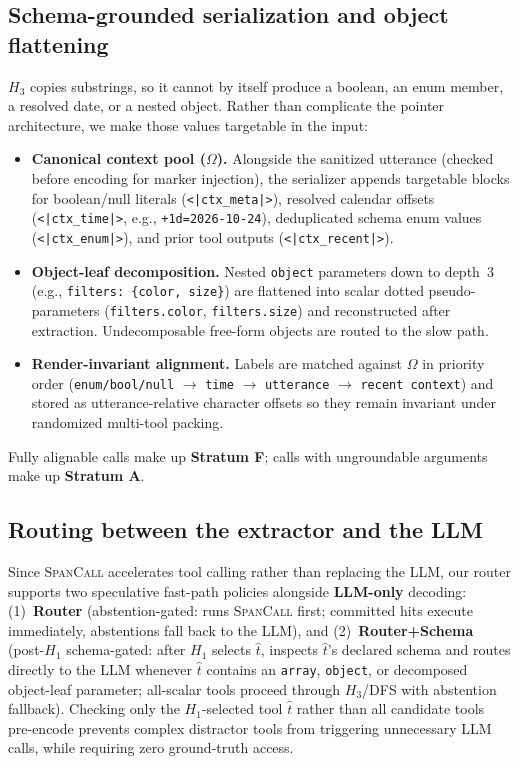 \subsection{Schema-grounded serialization and object flattening}
\label{sec:method:input}

$H_3$ copies substrings, so it cannot by itself produce a boolean, an enum member, a resolved date, or a nested object. Rather than complicate the pointer architecture, we make those values targetable in the input:
\begin{itemize}
    \item \textbf{Canonical context pool ($\Omega$).} Alongside the sanitized utterance (checked before encoding for marker injection), the serializer appends targetable blocks for boolean/null literals (\texttt{<|ctx\_meta|>}), resolved calendar offsets (\texttt{<|ctx\_time|>}, e.g., \texttt{+1d=2026-10-24}), deduplicated schema enum values (\texttt{<|ctx\_enum|>}), and prior tool outputs (\texttt{<|ctx\_recent|>}).
    \item \textbf{Object-leaf decomposition.} Nested \texttt{object} parameters down to depth~3 (e.g., \texttt{filters: \{color, size\}}) are flattened into scalar dotted pseudo-parameters (\texttt{filters.color}, \texttt{filters.size}) and reconstructed after extraction. Undecomposable free-form objects are routed to the slow path.
    \item \textbf{Render-invariant alignment.} Labels are matched against $\Omega$ in priority order (\texttt{enum/bool/null} $\rightarrow$ \texttt{time} $\rightarrow$ \texttt{utterance} $\rightarrow$ \texttt{recent context}) and stored as utterance-relative character offsets so they remain invariant under randomized multi-tool packing.
\end{itemize}
Fully alignable calls make up \textbf{Stratum F}; calls with ungroundable arguments make up \textbf{Stratum A}.

\subsection{Routing between the extractor and the LLM}
\label{sec:method:router}

Since \textsc{SpanCall} accelerates tool calling rather than replacing the LLM, our router supports two speculative fast-path policies alongside \textbf{LLM-only} decoding: (1)~\textbf{Router} (abstention-gated: runs \textsc{SpanCall} first; committed hits execute immediately, abstentions fall back to the LLM), and (2)~\textbf{Router+Schema} (post-$H_1$ schema-gated: after $H_1$ selects $\hat{t}$, inspects $\hat{t}$'s declared schema and routes directly to the LLM whenever $\hat{t}$ contains an \texttt{array}, \texttt{object}, or decomposed object-leaf parameter; all-scalar tools proceed through $H_3$/DFS with abstention fallback). Checking only the $H_1$-selected tool $\hat{t}$ rather than all candidate tools pre-encode prevents complex distractor tools from triggering unnecessary LLM calls, while requiring zero ground-truth access.